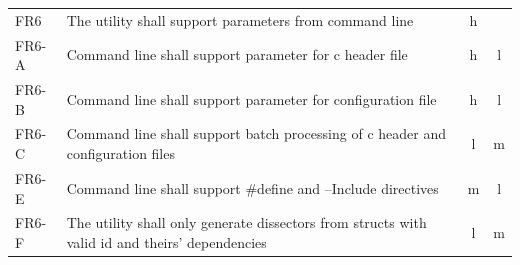\begin{table}[htbp]
{\begin{tabularx}{1.2\textwidth}{l X c c}
	\midrule
	FR6 & The \gls{utility} shall support parameters from command line & \Gls{h} & \\
	FR6-A & Command line shall support parameter for \Gls{c} \gls{header} file & \Gls{h} & \Gls{l} \\
	FR6-B & Command line shall support parameter for configuration file & \Gls{h} & \Gls{l} \\
	FR6-C & Command line shall support batch processing of \Gls{c} \gls{header} and configuration files & \Gls{l} & \Gls{m} \\
	FR6-E & Command line shall support \#define and --Include directives & \Gls{m} & \Gls{l} \\
	FR6-F & The utility shall only generate dissectors from structs with valid id and theirs' dependencies & \Gls{l} & \Gls{m} \\
	\bottomrule
\end{tabularx}}
\end{table}

\begin{table}[htbp] \footnotesize \center
\caption{Optional Requirements\label{tab:req:func2}}
\noindent{}
\end{table}

